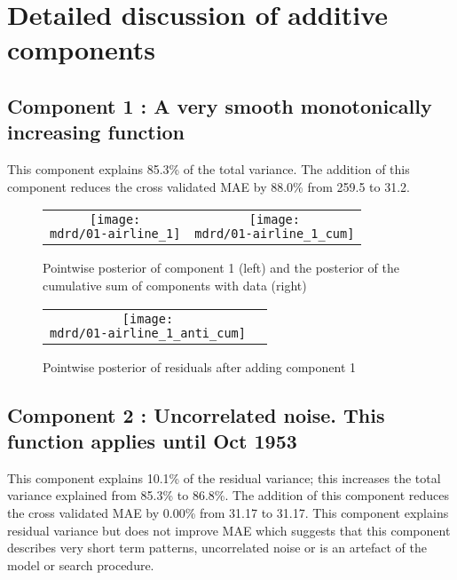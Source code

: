 \documentclass{article} %
\begin{document}
\section{Detailed discussion of additive components}
\label{sec:discussion}

\subsection{Component 1 : A very smooth monotonically increasing function}



This component explains 85.3\% of the total variance.
The addition of this component reduces the cross validated MAE by 88.0\% from 259.5 to 31.2.


\begin{figure}[H]
\newcommand{\wmgd}{0.5\columnwidth}
\newcommand{\hmgd}{3.0cm}
\newcommand{\mdrd}{01-airline}
\newcommand{\mbm}{\hspace{-0.3cm}}
\begin{tabular}{cc}
\mbm \texttt{[image: \\mdrd/01-airline\_1]} & \texttt{[image: \\mdrd/01-airline\_1\_cum]}
\end{tabular}
\caption{Pointwise posterior of component 1 (left) and the posterior of the cumulative sum of components with data (right)}
\label{fig:comp1}
\end{figure}

\begin{figure}[H]
\newcommand{\wmgd}{0.5\columnwidth}
\newcommand{\hmgd}{3.0cm}
\newcommand{\mdrd}{01-airline}
\newcommand{\mbm}{\hspace{-0.3cm}}
\begin{tabular}{cc}
\mbm \texttt{[image: \\mdrd/01-airline\_1\_anti\_cum]}
\end{tabular}
\caption{Pointwise posterior of residuals after adding component 1}
\label{fig:comp1}
\end{figure}

\subsection{Component 2 : Uncorrelated noise. This function applies until Oct 1953}



This component explains 10.1\% of the residual variance; this increases the total variance explained from 85.3\% to 86.8\%.
The addition of this component reduces the cross validated MAE by 0.00\% from 31.17 to 31.17.
This component explains residual variance but does not improve MAE which suggests that this component describes very short term patterns, uncorrelated noise or is an artefact of the model or search procedure.
\end{document}
